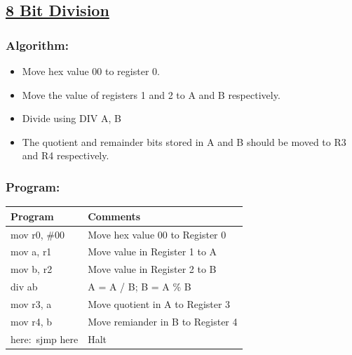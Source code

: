 \documentclass[12pt,a4paper]{article}
\begin{document}
\begin{flushleft}
\subsection*{\textbf{\underline{8 Bit Division}}}

\subsubsection*{\textbf{Algorithm:}}
\begin{itemize}
    \item Move hex value 00 to register 0. 
    \item Move the value of registers 1 and 2 to A and B respectively.
    \item Divide using DIV A, B
    \item The quotient and remainder bits stored in A and B should be moved to R3 and R4 respectively.
\end{itemize}

\newpage
\subsubsection*{\textbf{Program:}}

\begin{table}[htb]
\centering
\begin{tabular}{|l|l|} 
\hline
\textbf{Program}                                                 & \textbf{Comments}                             \\ 
\hline
\hline
mov r0, \#00                                                     & Move hex value 00 to Register 0               \\
\hline
mov a, r1                                                        & Move value in Register 1 to A                 \\
\hline
mov b, r2                                                        & Move value in Register 2 to B                 \\
\hline          
div ab                                                           & A = A / B; B = A \% B                         \\
\hline
mov r3, a                                                        & Move quotient in A to Register 3              \\
\hline 
mov r4, b                                                        & Move remiander in B to Register 4             \\
\hline
here:~sjmp here                                                  & Halt                                          \\
\hline
\end{tabular}
\end{table}


\end{flushleft}
\end{document}
